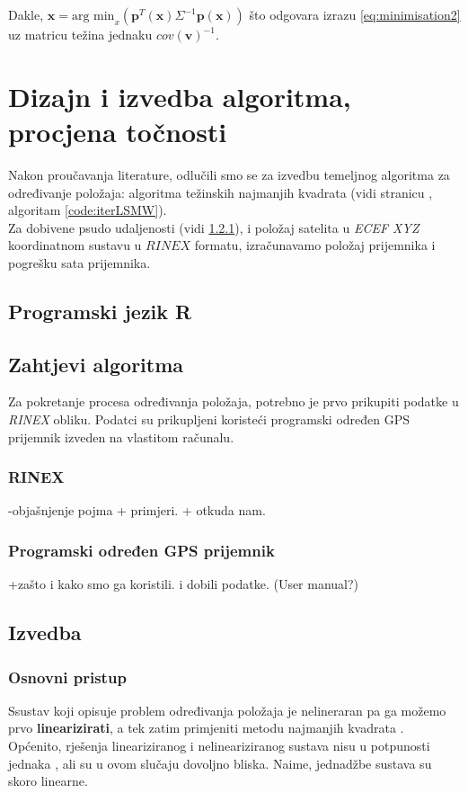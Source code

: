 \documentclass[a4paper,twoside,12pt]{memoir} %
\begin{document}
Dakle, $\hat{\mathbf{x}} = \text{arg min}_x \left( \mathbf{p}^T (\mathbf{x}) \Sigma^{-1}\mathbf{p} (\mathbf{x}) \right)$ 
što odgovara izrazu \ref{eq:minimisation2} uz matricu težina jednaku $cov(\mathbf{v})^{-1}$.

\chapter{Dizajn i izvedba algoritma, procjena točnosti}\label{sec:izvedba}
Nakon proučavanja literature, odlučili smo se za izvedbu temeljnog algoritma 
za određivanje položaja: algoritma težinskih najmanjih kvadrata (vidi stranicu \pageref{code:iterLSMW}, algoritam \ref{code:iterLSMW}).
\\Za dobivene psudo udaljenosti (vidi \ref{sssec:rinex}), i 
položaj satelita u \textit{ECEF XYZ} koordinatnom sustavu u $RINEX$ formatu, izračunavamo položaj
prijemnika i pogrešku sata prijemnika.
\section{Programski jezik R}
\section{Zahtjevi algoritma}
Za pokretanje procesa određivanja položaja, potrebno je prvo prikupiti podatke u \textit{RINEX} obliku. Podatci su prikupljeni koristeći programski određen GPS prijemnik izveden na vlastitom računalu.
\subsection{RINEX}\label{sssec:rinex}
-objašnjenje pojma + primjeri. + otkuda nam.
\subsection{Programski određen GPS prijemnik}
+zašto i kako smo ga koristili. i dobili podatke. (User manual?)

\section{Izvedba}

\subsection{Osnovni pristup}
Ssustav koji opisuje problem određivanja položaja je nelineraran pa
ga možemo prvo \textbf{linearizirati}, a tek zatim primjeniti metodu najmanjih kvadrata \cite{googleSchoolar1}.
Općenito, rješenja lineariziranog i nelineariziranog sustava nisu u potpunosti jednaka \cite{singer07}, ali su u ovom slučaju dovoljno bliska. Naime, jednadžbe sustava su skoro linearne.%
\end{document}
